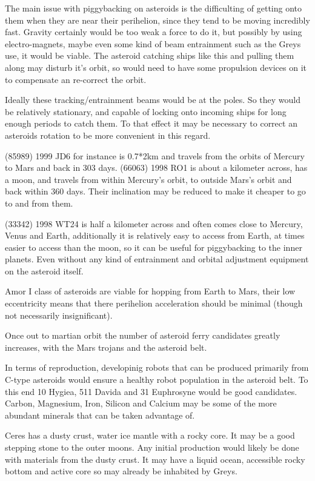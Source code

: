 The main issue with piggybacking on asteroids is the difficulting of getting
onto them when they are near their perihelion, since they tend to be moving
incredibly fast.  Gravity certainly would be too weak a force to do it,  but
possibly by using electro-magnets, maybe even some kind of beam entrainment such
as the Greys use, it would be viable. The asteroid catching ships like this and
pulling them along may disturb it's orbit, so would need to have some propulsion
devices on it to compensate an re-correct the orbit.

Ideally these tracking/entrainment beams would be at the poles. So they would be
 relatively stationary, and capable of locking onto incoming ships for long enough periods
to catch them.  To that effect it may be necessary to correct an asteroids
rotation to be more convenient in this regard.

(85989) 1999 JD6 for instance is 0.7*2km and travels from the orbits of Mercury 
to Mars and back in 303 days. 
(66063) 1998 RO1 is about a kilometer across, has a moon, and travels from
within Mercury's orbit, to outside Mars's orbit and back within 360 days. 
Their inclination may be reduced to make it cheaper to go to and from
them. 

(33342) 1998 WT24 is half a kilometer across and often comes close to Mercury, 
Venus and Earth, additionally it is relatively easy to access from Earth, at 
times easier to access than the moon,  so it can be useful for piggybacking to 
the inner planets. Even without any kind of entrainment and orbital adjustment
equipment on the asteroid itself. 

Amor I class of asteroids are viable for hopping from Earth to Mars, their low
eccentricity means that there perihelion acceleration should be minimal (though
not necessarily insignificant).

Once out to martian orbit the number of asteroid ferry candidates greatly 
increases, with the Mars trojans and the asteroid belt.

In terms of reproduction, developinig robots that can be produced primarily 
from C-type asteroids would ensure a healthy robot population in the asteroid
belt. To this end 10 Hygiea, 511 Davida and 31 Euphrosyne would be good 
candidates. Carbon, Magnesium, Iron, Silicon and Calcium may be some of the more
abundant minerals that can be taken advantage of.

Ceres has a dusty crust,  water ice mantle with a rocky core. It may be a 
good stepping stone to the outer moons. Any initial production
would likely be done with materials from the dusty crust. It may have a liquid
ocean, accessible rocky bottom and active core so may already be 
inhabited by Greys. 

